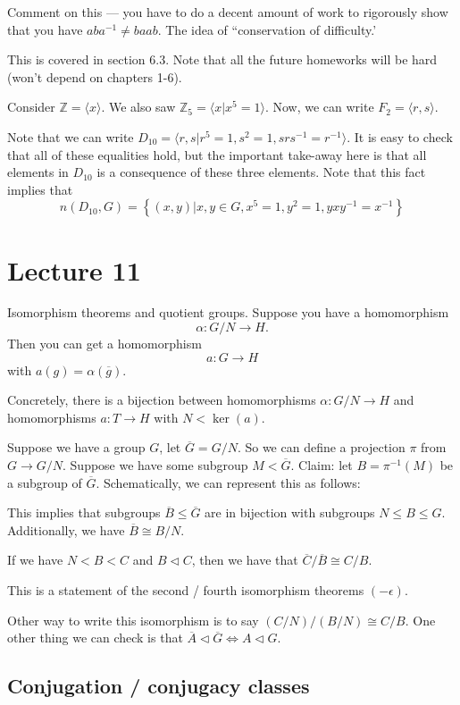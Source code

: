 \documentclass[12pt]{article}
\newcommand{\ol}{\overline}
\def\ZZ{\mathbb{Z}}
\begin{document}
  Comment on this --- you have to do a decent amount of work to rigorously show that you have $aba^{-1} \neq baab$.  The idea of ``conservation of difficulty.'

  This is covered in section 6.3.  Note that all the future homeworks will be hard (won't depend on chapters 1-6).

  Consider $\ZZ = \langle x \rangle$.  We also saw $\ZZ_5 = \langle x | x^{5} = 1 \rangle$.  Now, we can write $F_2 = \langle r, s \rangle$.  
  
  Note that we can write $D_{10} = \langle r, s | r^5 = 1, s^2 = 1, srs^{-1} = r^{-1} \rangle$.  It is easy to check that all of these equalities hold, but the important take-away here is that all elements in $D_{10}$ is a consequence of these three elements.  Note that this fact implies that 
  \[
  n(D_{10}, G) = \left\{ (x, y) | x, y \in G, x^{5} = 1, y^{2} = 1, yxy^{-1} = x^{-1} \right\}
  \]

  \section{Lecture 11}

  Isomorphism theorems and quotient groups.  Suppose you have a homomorphism
\[
  \alpha: G / N \to H.
\]
Then you can get a homomorphism
\[
  a : G \to H
\]
with $a(g) = \alpha(\ol{g})$.

Concretely, there is a bijection between homomorphisms $\alpha: G/N \to H$ and homomorphisms $a: T \to H$ with $N < \ker(a)$.

Suppose we have a group $G$, let $\ol{G} = G / N$.  So we can define a projection $\pi$ from $G \to G/N$.  Suppose we have some subgroup $M < \ol{G}$.  Claim: let $B = \pi^{-1}(M)$ be a subgroup of $\ol{G}$. Schematically, we can represent this as follows:


This implies that subgroups $\ol{B} \leq \ol{G}$ are in bijection with subgroups $N \leq B \leq G$.  Additionally, we have $\ol{B} \cong B / N$.

If we have $N < B < C$ and $B \triangleleft C$, then we have that $\ol{C} / \ol{B} \cong C / B$.  

This is a statement of the second / fourth isomorphism theorems $(- \epsilon)$.

Other way to write this isomorphism is to say $(C/N) / (B/N) \cong C/B$.  One other thing we can check is that $\ol{A} \triangleleft \ol{G} \Leftrightarrow A \triangleleft G$.

\subsection{Conjugation / conjugacy classes}
\end{document}
